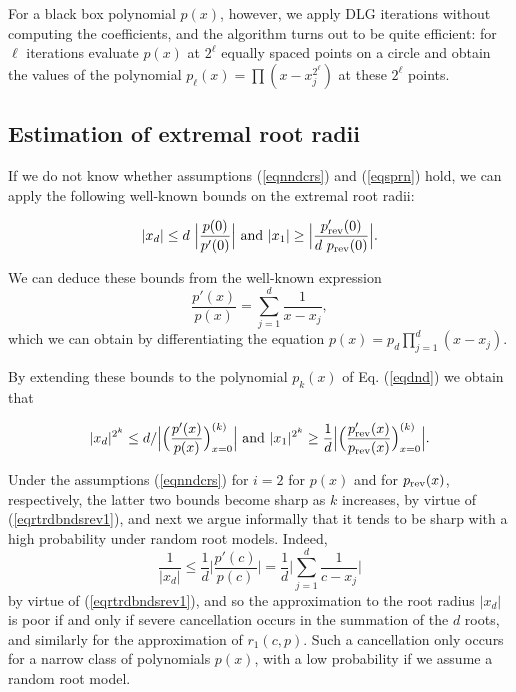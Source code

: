 \documentclass[runningheads]{llncs}
\begin{document}
%
For a black box polynomial $p(x)$, however, we apply DLG iterations without computing the coefficients, and the algorithm turns out to be quite efficient:
 for $\ell$ iterations  evaluate
 $p(x)$ at  $2^{\ell}$ equally spaced points on a circle and obtain
 the values of the polynomial $p_{\ell}(x)=\prod\left(x-x_j^{2^{\ell}}\right)$
 at these $2^{\ell}$ points.



\subsection{Estimation of extremal root radii}\label{sestextrrtrd}


If we do not know whether assumptions (\ref{eqnndcrs}) and (\ref{eqsprn}) hold, we can apply
 the following well-known bounds on the extremal root radii:

 \begin{equation}\label{eqrtrdbndsrev1}
|x_d|\le d~\Big |\frac{p(0)}{p'(0)}\Big |~{\rm and}~|x_1|\ge \Big |\frac{p'_{\rm rev}(0)}{d~p_{\rm rev}(0)}\Big|.
\end{equation}

We can deduce these bounds
from the well-known expression
\begin{equation}\label{eqratio}
\frac{p'(x)}{p(x)}=
\sum_{j=1}^d\frac{1}{x-x_j},
\end{equation}
which we can obtain by differentiating the equation
$p(x)=p_d\prod_{j=1}^d(x-x_j)$.

By extending these bounds to
the polynomial $p_k(x)$ of Eq. (\ref{eqdnd}) we obtain that

 \begin{equation}\label{eqratio0}
 |x_d|^{2^k}\le d/
\Big| \Big(\frac{p'(x)}{p(x)}\Big)_{x=0}^{(k)}\Big|~{\rm and}~|x_1|^{2^k}\ge \frac{1}{d}\Big| \Big(\frac{p'_{\rm rev}(x)}{p_{\rm rev}(x)}\Big)_{x=0}^{(k)}\Big|.
\end{equation}

Under the
assumptions (\ref{eqnndcrs}) for $i=2$ for $p(x)$ and for $p_{\rm rev}(x)$, respectively,  the latter two bounds
 become sharp as $k$ increases, by virtue of (\ref{eqrtrdbndsrev1}), and next we  argue informally that it tends to be sharp with a high probability under  random root models.
Indeed,
\begin{equation}\label{eqratiorcp}
\frac{1}{|x_d|}\le \frac{1}{d}\Big|\frac{p'(c)}{p(c)}\Big|=\frac{1}{d}\Big|\sum_{j=1}^d \frac{1}{c-x_j}\Big|
\end{equation}
by  virtue of
(\ref{eqrtrdbndsrev1}), and so the
 approximation
to the root radius $|x_d|$ is poor if and only if severe cancellation occurs in the summation of the $d$ roots, and similarly for the approximation
of  $r_1(c,p)$. Such a cancellation only occurs for a narrow class of polynomials $p(x)$, with a low  probability if we assume a random root model.
\end{document}
